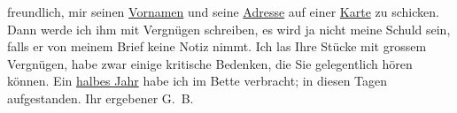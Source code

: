                freundlich, mir seinen \uline{Vornamen} und seine \uline{Adresse} auf einer \uline{Karte} zu
               schicken. Dann werde ich ihm mit Vergnügen schreiben, es wird ja nicht meine Schuld
               sein, falls er von meinem Brief keine Notiz nimmt. Ich las Ihre Stücke mit grossem Vergnügen, habe zwar
               einige kritische Bedenken, die Sie gelegentlich hören können. Ein \uline{halbes Jahr} habe ich im Bette verbracht; in diesen Tagen
               aufgestanden. Ihr ergebener \spacefill\mbox{G. B.}\pend
           \endnumbering{}  \newcommand{\dateiname}{L00924}\newcommand{\titel}{Georg Brandes an Arthur Schnitzler, 12. 6. 1899}\newcommand{\editorInnen}{Martin Anton Müller und Gerd-Hermann Susen}
